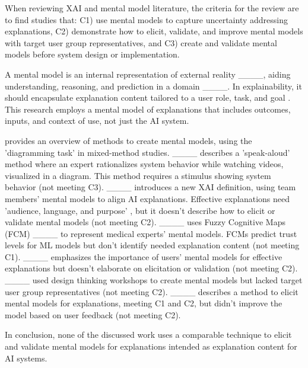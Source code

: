 When reviewing XAI and mental model literature, the criteria for the review are to find studies that: C1) use mental models to capture uncertainty addressing explanations, C2) demonstrate how to elicit, validate, and improve mental models with target user group representatives, and C3) create and validate mental models before system design or implementation.

A mental model is an internal representation of external reality ____, aiding understanding, reasoning, and prediction in a domain ____. In explainability, it should encapsulate explanation content tailored to a user role, task, and goal \cite[P. 9]{Hoffman2019metrics-misc}. This research employs a mental model of explanations that includes outcomes, inputs, and context of use, not just the AI system.

\cite[p. 5]{Hoffman2023-MeasureXAI-FrontiersinCS-article} provides an overview of methods to create mental models, using the 'diagramming task' in mixed-method studies. ____ describes a 'speak-aloud' method where an expert rationalizes system behavior while watching videos, visualized in a diagram. This method requires a stimulus showing system behavior (not meeting C3). ____ introduces a new XAI definition, using team members' mental models to align AI explanations. Effective explanations need 'audience, language, and purpose' \cite[p. 5]{Merry2021-article}, but it doesn't describe how to elicit or validate mental models (not meeting C2). ____ uses Fuzzy Cognitive Maps (FCM) ____ to represent medical experts' mental models. FCMs predict trust levels for ML models but don't identify needed explanation content (not meeting C1). ____ emphasizes the importance of users' mental models for effective explanations but doesn't elaborate on elicitation or validation (not meeting C2). ____ used design thinking workshops to create mental models but lacked target user group representatives (not meeting C2). ____ describes a method to elicit mental models for explanations, meeting C1 and C2, but didn't improve the model based on user feedback (not meeting C2).

In conclusion, none of the discussed work uses a comparable technique to elicit and validate mental models for explanations intended as explanation content for AI systems.

